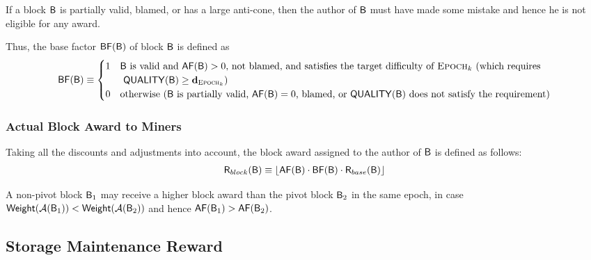 	If a block $\textsf{B}$ is partially valid, blamed, or has a large anti-cone, then the author of $\textsf{B}$ must have made some mistake and hence he is not eligible for any award.


Thus, the base factor $\mathsf{BF}(\textsf{B})$ of block $\textsf{B}$ is defined as
\begin{align}\label{eq:basef}
	\mathsf{BF}(\textsf{B})\equiv \begin{cases}
		1 & \mbox{$\textsf{B}$ is valid and $\mathsf{AF}(\textsf{B})>0$, {not blamed, and satisfies the target difficulty of $\textsc{Epoch}_k$ (which requires  }}\\
		~ & \mbox{ $\mathsf{QUALITY}(\textsf{B})\ge \mathbf{d}_{\textsc{Epoch}_k}$)}\\
		0 & \mbox{otherwise ($\textsf{B}$ is partially valid, {$\mathsf{AF}(\textsf{B})=0$, blamed}, or $\mathsf{QUALITY}(\textsf{B})$ does not satisfy the requirement)} 
	\end{cases}
\end{align}

\subsubsection{Actual Block Award to Miners}
	\label{subsubsec:actualblockaward}
	Taking all the discounts and adjustments into account,
	the block award assigned to the author of $\textsf{B}$ is defined as follows:
	\begin{align}
		\textsf{R}_{block}(\textsf{B}) \equiv \left\lfloor\mathsf{AF}(\textsf{B})\cdot \mathsf{BF}(\textsf{B})
		\cdot \textsf{R}_{base}(\textsf{B})\right\rfloor
	\end{align}


	A non-pivot block $\textsf{B}_1$ may receive a higher block award than the pivot block $\textsf{B}_2$ 
	in the same epoch,
	in case $\mathsf{Weight}(\mathcal{A}(\textsf{B}_1))<\mathsf{Weight}(\mathcal{A}(\textsf{B}_2))$ 
	and hence $\mathsf{AF}(\textsf{B}_1)>\mathsf{AF}(\textsf{B}_2)$.




	\subsection{Storage Maintenance Reward}
	\label{subsec:storagefee}

